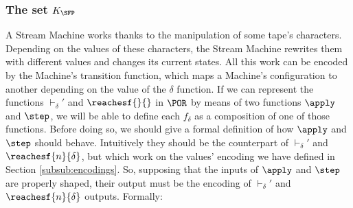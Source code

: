 \begin{conditional}{\notappendix}
  \subsubsection{The set $K_\SFP$}

  A Stream Machine works thanks to the manipulation of some tape's characters.
  Depending on the values of these characters, the Stream Machine rewrites them
  with different values and changes its current states.
  All this work can be encoded by the Machine's transition function, which maps
  a Machine's configuration to another depending on the value of the $\delta$ function.
  If we can represent the functions $\vdash_\delta'$ and $\reachesf {}{}$ in
  $\POR$ by means of two functions $\apply$ and $\step$,
  we will be able to define each $f_\delta$ as
  a composition of one of those functions.
  Before doing so, we should give a formal definition of how $\apply$ and $\step$
  should behave. Intuitively they should be the counterpart of $\vdash_\delta'$
  and $\reachesf {n}{\delta}$, but which work on the values' encoding we have defined
  in Section \ref{subsub:encodings}. So, supposing that the inputs of $\apply$ and $\step$
  are properly shaped, their output must be
  the encoding of $\vdash_\delta'$
  and $\reachesf {n}{\delta}$ outputs. Formally:


\end{conditional}
